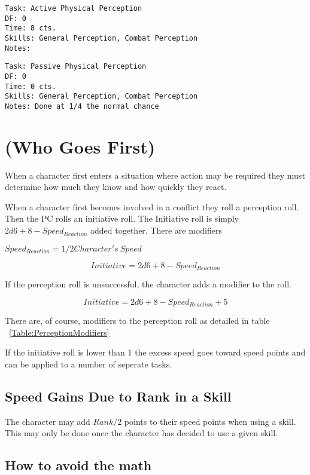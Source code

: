 \begin{verbatim}
Task: Active Physical Perception  
DF: 0 
Time: 8 cts. 
Skills: General Perception, Combat Perception
Notes: 
\end{verbatim}

\begin{verbatim}
Task: Passive Physical Perception  
DF: 0 
Time: 0 cts. 
Skills: General Perception, Combat Perception
Notes: Done at 1/4 the normal chance 
\end{verbatim}



\section{ (Who Goes First)}

When a character first enters a situation where action may be required they must determine
how much they know and how quickly they react.

When a character first becomes involved in a conflict they roll a perception roll. Then the PC rolls an initiative roll. The 
Initiative roll is simply $ 2d6 + 8 - Speed_{Reaction} $ added together. There are modifiers 

$ Speed_{Reaction} = 1/2 {Character's\ Speed } $

\[{Initiative} = 2d6 + 8 - Speed_{Reaction}\]

If the perception roll is unsuccessful, the character adds a modifier 
to the roll. 

\[{Initiative} = 2d6 + 8 - Speed_{Reaction} + 5\]

There are, of course, modifiers to the perception roll as detailed in table 
~\ref{Table:PerceptionModifiers}

If the initiative roll is lower than 1 the excess speed goes toward speed points 
and can be applied to a number of seperate tasks.

\subsection{Speed Gains Due to Rank in a Skill}

The character may add \( Rank/2 \) points to their speed points when using a
skill. This may only be done once the character has decided to use a
given skill. 

\subsection{How to avoid the math}

